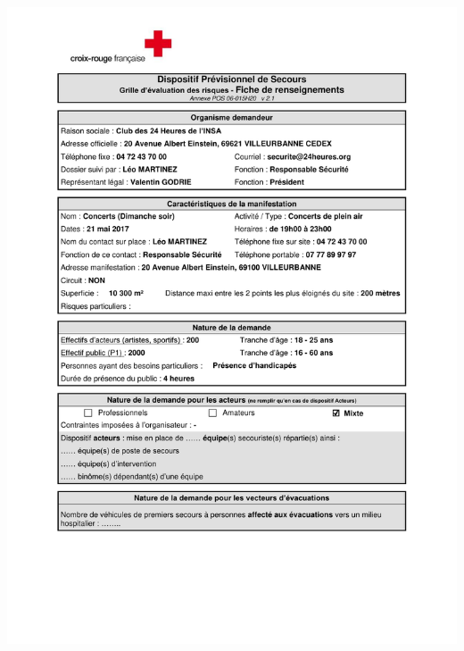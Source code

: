 \documentclass[hidelinks, paper=a4, fontsize=13pt]{report}
\begin{document}
\begin{center}
	\includegraphics[scale=0.70, page=1]{Annexes/Documents/Fiche_RIS_Concerts_Dim_2017}
\end{center}
\end{document}
